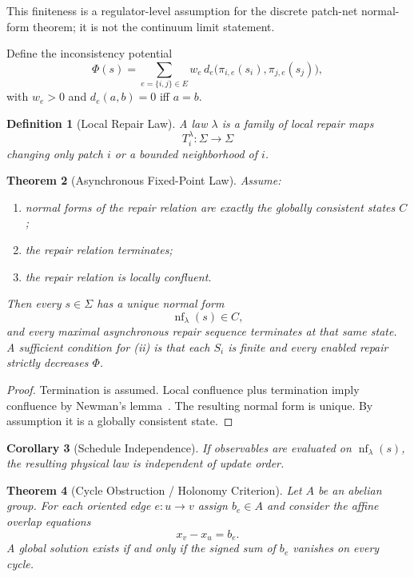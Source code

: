 \documentclass[11pt]{article}
\newtheorem{theorem}{Theorem}[section]
\newtheorem{corollary}[theorem]{Corollary}
\newtheorem{definition}[theorem]{Definition}
\newcommand{\nf}{\operatorname{nf}}
\begin{document}
This finiteness is a regulator-level assumption for the discrete patch-net normal-form theorem; it is not the continuum limit statement.

Define the inconsistency potential
\[
\Phi(s)=\sum_{e=\{i,j\}\in E}w_e\, d_e\!\bigl(\pi_{i,e}(s_i),\pi_{j,e}(s_j)\bigr),
\]
with $w_e>0$ and $d_e(a,b)=0$ iff $a=b$.

\begin{definition}[Local Repair Law]
A law $\lambda$ is a family of local repair maps
\[
T_i^\lambda:\Sigma\to\Sigma
\]
changing only patch $i$ or a bounded neighborhood of $i$.
\end{definition}

\begin{theorem}[Asynchronous Fixed-Point Law]\label{thm:confluence}
Assume:
\begin{enumerate}[label=(\roman*),leftmargin=2em]
\item normal forms of the repair relation are exactly the globally consistent states $C$;
\item the repair relation terminates;
\item the repair relation is locally confluent.
\end{enumerate}
Then every $s\in\Sigma$ has a unique normal form
\[
\nf_\lambda(s)\in C,
\]
and every maximal asynchronous repair sequence terminates at that same state.
A sufficient condition for (ii) is that each $S_i$ is finite and every enabled repair strictly decreases $\Phi$.
\end{theorem}

\begin{proof}
Termination is assumed. Local confluence plus termination imply confluence by Newman's lemma~\cite{newman42}. The resulting normal form is unique. By assumption it is a globally consistent state.
\end{proof}

\begin{corollary}[Schedule Independence]
If observables are evaluated on $\nf_\lambda(s)$, the resulting physical law is independent of update order.
\end{corollary}

\begin{theorem}[Cycle Obstruction / Holonomy Criterion]\label{thm:holonomy}
Let $A$ be an abelian group. For each oriented edge $e:u\to v$ assign $b_e\in A$ and consider the affine overlap equations
\[
x_v-x_u=b_e.
\]
A global solution exists if and only if the signed sum of $b_e$ vanishes on every cycle.
\end{theorem}
\end{document}
